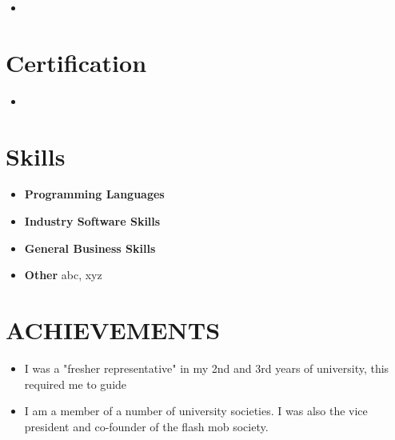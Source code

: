 \documentclass[11pt,a4paper,sans]{moderncv}
\begin{document}
\begin{itemize}

\item{}

\end{itemize}

\section{Certification}

\begin{itemize}

\item{}
\vspace{6pt}

\end{itemize}

\section{Skills}

\begin{itemize}

\item \textbf{Programming Languages}
\vspace{6pt}

\item \textbf{Industry Software Skills} 
\vspace{6pt}

\item \textbf{General Business Skills}
\vspace{6pt}

\item \textbf{Other} abc, xyz
\vspace{6pt}

\end{itemize}

\section{ACHIEVEMENTS}

\begin{itemize}

\item{I was a "fresher representative" in my 2nd and 3rd years of university, this required me to guide}
\vspace{6pt}

\item{I am a member of a number of university societies. I was also the vice president and co-founder of the flash mob society.}
\vspace{6pt}

\end{itemize}
\end{document}
